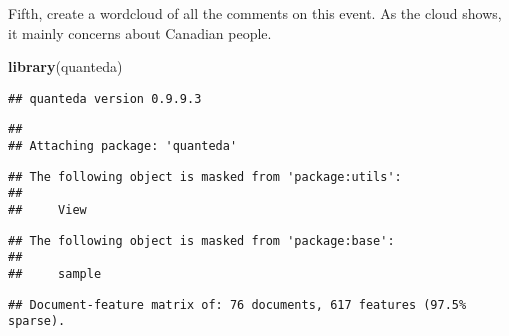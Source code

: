 \documentclass[]{article}
\newenvironment{Shaded}{\begin{snugshade}}{\end{snugshade}}
\newcommand{\KeywordTok}[1]{\textcolor[rgb]{0.13,0.29,0.53}{\textbf{{#1}}}}
\newcommand{\StringTok}[1]{\textcolor[rgb]{0.31,0.60,0.02}{{#1}}}
\newcommand{\NormalTok}[1]{{#1}}
\begin{document}
Fifth, create a wordcloud of all the comments on this event. As the
cloud shows, it mainly concerns about Canadian people.

\begin{Shaded}
\begin{Highlighting}[]
\KeywordTok{library}\NormalTok{(quanteda)}
\end{Highlighting}
\end{Shaded}

\begin{verbatim}
## quanteda version 0.9.9.3
\end{verbatim}

\begin{verbatim}
## 
## Attaching package: 'quanteda'
\end{verbatim}

\begin{verbatim}
## The following object is masked from 'package:utils':
## 
##     View
\end{verbatim}

\begin{verbatim}
## The following object is masked from 'package:base':
## 
##     sample
\end{verbatim}

\begin{Shaded}
\end{Shaded}

\begin{verbatim}
## Document-feature matrix of: 76 documents, 617 features (97.5% sparse).
\end{verbatim}
\end{document}
